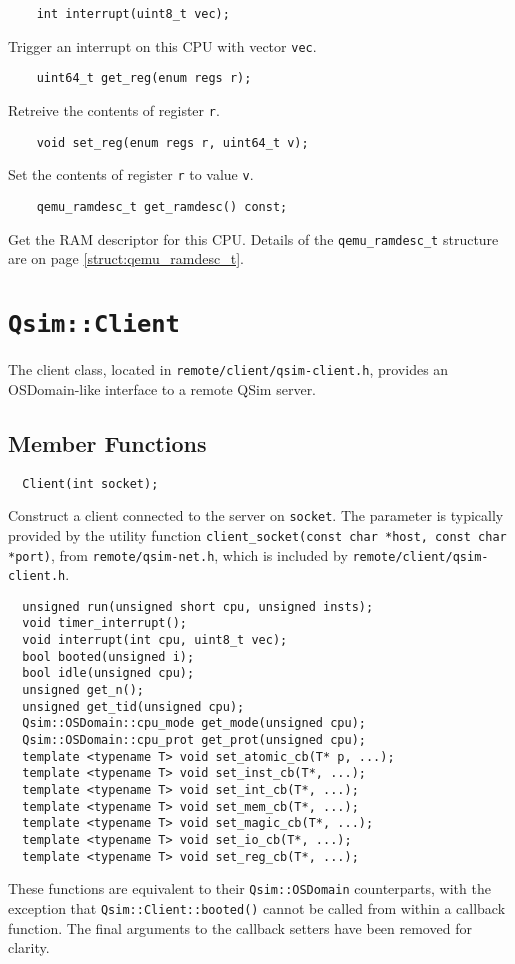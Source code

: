\documentclass[letterpaper, 10pt]{book}
\begin{document}
\begin{verbatim}
    int interrupt(uint8_t vec);
\end{verbatim}
Trigger an interrupt on this CPU with vector \texttt{vec}.

\begin{verbatim}
    uint64_t get_reg(enum regs r);
\end{verbatim}
Retreive the contents of register \texttt{r}.

\begin{verbatim}
    void set_reg(enum regs r, uint64_t v);
\end{verbatim}
Set the contents of register \texttt{r} to value \texttt{v}.

\begin{verbatim}
    qemu_ramdesc_t get_ramdesc() const;
\end{verbatim}
Get the RAM descriptor for this CPU. Details of the \texttt{qemu\_ramdesc\_t}
structure are on page \ref{struct:qemu_ramdesc_t}.
\newpage

\section{\texttt{Qsim::Client}} \label{class:Client}
The client class, located in \texttt{remote/client/qsim-client.h}, provides an
OSDomain-like interface to a remote QSim server.

\subsection{Member Functions}

\label{func:Client}
\begin{verbatim}
  Client(int socket);
\end{verbatim}
Construct a client connected to the server on \texttt{socket}. The parameter is
typically provided by the utility function
\texttt{client\_socket(const char *host, const char *port)}, from
\texttt{remote/qsim-net.h}, which is included by
\texttt{remote/client/qsim-client.h}.

\begin{verbatim}
  unsigned run(unsigned short cpu, unsigned insts);
  void timer_interrupt();
  void interrupt(int cpu, uint8_t vec);
  bool booted(unsigned i);
  bool idle(unsigned cpu);
  unsigned get_n();
  unsigned get_tid(unsigned cpu);
  Qsim::OSDomain::cpu_mode get_mode(unsigned cpu);
  Qsim::OSDomain::cpu_prot get_prot(unsigned cpu);
  template <typename T> void set_atomic_cb(T* p, ...);
  template <typename T> void set_inst_cb(T*, ...);
  template <typename T> void set_int_cb(T*, ...);
  template <typename T> void set_mem_cb(T*, ...);
  template <typename T> void set_magic_cb(T*, ...);
  template <typename T> void set_io_cb(T*, ...);
  template <typename T> void set_reg_cb(T*, ...);

\end{verbatim}
These functions are equivalent to their \texttt{Qsim::OSDomain} counterparts,
with the exception that \texttt{Qsim::Client::booted()} cannot be called from
within a callback function. The final arguments to the callback setters have
been removed for clarity.
\end{document}

